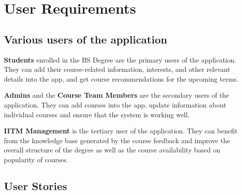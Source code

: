 \section{User Requirements}


\subsection{Various users of the application}


\textbf{Students} enrolled in the BS Degree are the primary users of the application. They can add their course-related information, interests, and other relevant details into the app, and get course recommendations for the upcoming terms.


\textbf{Admins} and the \textbf{Course Team Members} are the secondary users of the application. They can add courses into the app, update information about individual courses and ensure that the system is working well.


\textbf{IITM Management} is the tertiary user of the application. They can benefit from the knowledge base generated by the course feedback and improve the overall structure of the degree as well as the course availability based on popularity of courses.


\subsection{User Stories}

